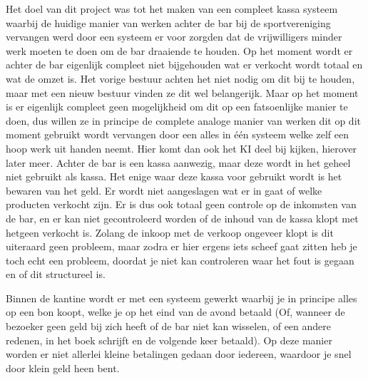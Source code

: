 Het doel van dit project was tot het maken van een compleet kassa systeem waarbij de huidige manier van werken achter de bar bij de sportvereniging vervangen werd door een systeem er voor zorgden dat de vrijwilligers minder werk moeten te doen om de bar draaiende te houden. 
Op het moment wordt er achter de bar eigenlijk compleet niet bijgehouden wat er verkocht wordt totaal en wat de omzet is. Het vorige bestuur achten het niet nodig om dit bij te houden, maar met een nieuw bestuur vinden ze dit wel belangerijk. Maar op het moment is er eigenlijk compleet geen mogelijkheid om dit op een fatsoenlijke manier te doen, dus willen ze in principe de complete analoge manier van werken dit op dit moment gebruikt wordt vervangen door een alles in \'{e}\'{e}n systeem welke zelf een hoop werk uit handen neemt. Hier komt dan ook het KI deel bij kijken, hierover later meer.
Achter de bar is een kassa aanwezig, maar deze wordt in het geheel niet gebruikt als kassa. Het enige waar deze kassa voor gebruikt wordt is het bewaren van het geld. Er wordt niet aangeslagen wat er in gaat of welke producten verkocht zijn. Er is dus ook totaal geen controle op de inkomsten van de bar, en er kan niet gecontroleerd worden of de inhoud van de kassa klopt met hetgeen verkocht is. Zolang de inkoop met de verkoop ongeveer klopt is dit uiteraard geen probleem, maar zodra er hier ergens iets scheef gaat zitten heb je toch echt een probleem, doordat je niet kan controleren waar het fout is gegaan en of dit structureel is.

Binnen de kantine wordt er met een systeem gewerkt waarbij je in principe alles op een bon koopt, welke je op het eind van de avond betaald (Of, wanneer de bezoeker geen geld bij zich heeft of de bar niet kan wisselen, of een andere redenen, in het boek schrijft en de volgende keer betaald). Op deze manier worden er niet allerlei kleine betalingen gedaan door iedereen, waardoor je snel door klein geld heen bent.

